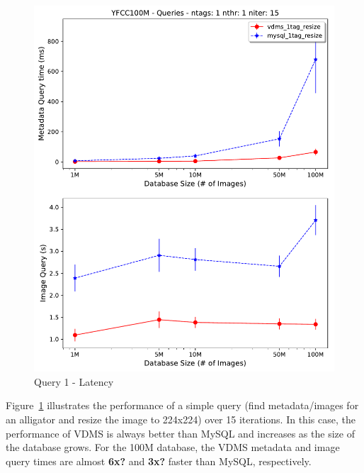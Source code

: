 \begin{figure}[]
\centering
\includegraphics[width=\columnwidth]{figures/q1_latency}
\caption{Query 1 - Latency}
\label{fig:q1_latency}
\end{figure}

Figure~\ref{fig:q1_latency} illustrates the performance of a simple query (find metadata/images for an alligator and resize the image to 224x224) over 15 iterations. In this case, the performance of VDMS is always better than MySQL and increases as the size of the database grows.  For the 100M database, the VDMS metadata and image query times are almost \textbf{6x?} and \textbf{3x?} faster than MySQL, respectively.  

